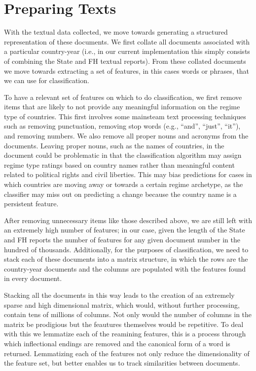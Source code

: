 \documentclass[pdftex,12pt,fullpage,oneside]{amsart}
\begin{document}
\section{Preparing Texts}

With the textual data collected, we move towards generating a structured representation of these documents. We first collate all documents associated with a particular country-year (i.e., in our current implementation this simply consists of combining the State and FH textual reports). From these collated documents we move towards extracting a set of features, in this cases words or phrases, that we can use for classification. 

To have a relevant set of features on which to do classification, we first remove items that are likely to not provide any meaningful information on the regime type of countries. This first involves some mainsteam text processing techniques such as removing punctuation, removing stop words (e.g., ``and'', ``just'', ``it''), and removing numbers. We also remove all proper nouns and acronyms from the documents. Leaving proper nouns, such as the names of countries, in the document could be problematic in that the classification algorithm may assign regime type ratings based on country names rather than meaningful content related to political rights and civil liberties. This may bias predictions for cases in which countries are moving away or towards a certain regime archetype, as the classifier may miss out on predicting a change because the country name is a persistent feature.

After removing unnecessary items like those described above, we are still left with an extremely high number of features; in our case, given the length of the State and FH reports the number of features for any given document number in the hundred of thousands. Additionally, for the purposes of classification, we need to stack each of these documents into a matrix structure, in which the rows are the country-year documents and the columns are populated with the features found in every document. 

Stacking all the documents in this way leads to the creation of an extremely sparse and high dimensional matrix, which would, without further processing, contain tens of millions of columns. Not only would the number of columns in the matrix be prodigious but the feautures themselves would be repetitive. To deal with this we lemmatize each of the reamining features, this is a process through which inflectional endings are removed and the canonical form of a word is returned. Lemmatizing each of the features not only reduce the dimensionality of the feature set, but better enables us to track similarities between documents. 
\end{document}
